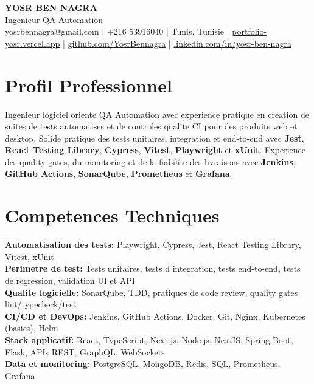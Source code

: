 \documentclass[10pt,a4paper]{article}
\begin{document}
\begin{center}
  {\Large\bfseries YOSR BEN NAGRA}\\[2pt]
  {\small Ingenieur QA Automation}\\[3pt]
  {\footnotesize yosrbennagra@gmail.com \;|\; +216 53916040 \;|\; Tunis, Tunisie \;|\; \href{https://portfolio-yosr.vercel.app/fr}{portfolio-yosr.vercel.app} \;|\; \href{https://github.com/YosrBennagra}{github.com/YosrBennagra} \;|\; \href{https://www.linkedin.com/in/yosr-ben-nagra/}{linkedin.com/in/yosr-ben-nagra}}
\end{center}

\section*{Profil Professionnel}
{\small
Ingenieur logiciel oriente QA Automation avec experience pratique en creation de suites de tests automatises et de controles qualite CI pour des produits web et desktop. Solide pratique des tests unitaires, integration et end-to-end avec \textbf{Jest}, \textbf{React Testing Library}, \textbf{Cypress}, \textbf{Vitest}, \textbf{Playwright} et \textbf{xUnit}. Experience des quality gates, du monitoring et de la fiabilite des livraisons avec \textbf{Jenkins}, \textbf{GitHub Actions}, \textbf{SonarQube}, \textbf{Prometheus} et \textbf{Grafana}.
}

\vspace{2pt}

\section*{Competences Techniques}
{\small
\textbf{Automatisation des tests:} Playwright, Cypress, Jest, React Testing Library, Vitest, xUnit\\[2pt]
\textbf{Perimetre de test:} Tests unitaires, tests d integration, tests end-to-end, tests de regression, validation UI et API\\[2pt]
\textbf{Qualite logicielle:} SonarQube, TDD, pratiques de code review, quality gates lint/typecheck/test\\[2pt]
\textbf{CI/CD et DevOps:} Jenkins, GitHub Actions, Docker, Git, Nginx, Kubernetes (basics), Helm\\[2pt]
\textbf{Stack applicatif:} React, TypeScript, Next.js, Node.js, NestJS, Spring Boot, Flask, APIs REST, GraphQL, WebSockets\\[2pt]
\textbf{Data et monitoring:} PostgreSQL, MongoDB, Redis, SQL, Prometheus, Grafana
}
\end{document}
